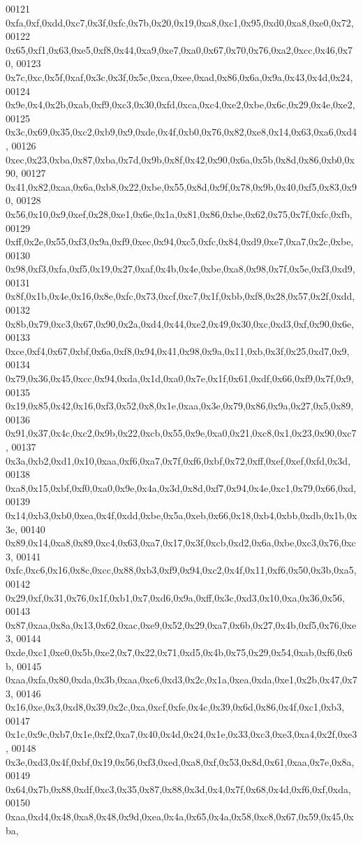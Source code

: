 \begin{DoxyCode}
00121   0xfa,0xf,0xdd,0xc7,0x3f,0xfc,0x7b,0x20,0x19,0xa8,0xc1,0x95,0xd0,0xa8,0xe0,0x72,
00122   0x65,0xf1,0x63,0xe5,0xf8,0x44,0xa9,0xe7,0xa0,0x67,0x70,0x76,0xa2,0xcc,0x46,0x70,
00123   0x7c,0xc,0x5f,0xaf,0x3c,0x3f,0x5c,0xca,0xee,0xad,0x86,0x6a,0x9a,0x43,0x4d,0x24,
00124   0x9e,0x4,0x2b,0xab,0xf9,0xc3,0x30,0xfd,0xca,0xc4,0xe2,0xbe,0x6c,0x29,0x4e,0xe2,
00125   0x3c,0x69,0x35,0xc2,0xb9,0x9,0xde,0x4f,0xb0,0x76,0x82,0xe8,0x14,0x63,0xa6,0xd4,
00126   0xec,0x23,0xba,0x87,0xba,0x7d,0x9b,0x8f,0x42,0x90,0x6a,0x5b,0x8d,0x86,0xb0,0x90,
00127   0x41,0x82,0xaa,0x6a,0xb8,0x22,0xbe,0x55,0x8d,0x9f,0x78,0x9b,0x40,0xf5,0x83,0x90,
00128   0x56,0x10,0x9,0xef,0x28,0xe1,0x6e,0x1a,0x81,0x86,0xbe,0x62,0x75,0x7f,0xfc,0xfb,
00129   0xff,0x2e,0x55,0xf3,0x9a,0xf9,0xec,0x94,0xc5,0xfc,0x84,0xd9,0xe7,0xa7,0x2c,0xbe,
00130   0x98,0xf3,0xfa,0xf5,0x19,0x27,0xaf,0x4b,0x4e,0xbe,0xa8,0x98,0x7f,0x5e,0xf3,0xd9,
00131   0x8f,0x1b,0x4e,0x16,0x8e,0xfc,0x73,0xcf,0xc7,0x1f,0xbb,0xf8,0x28,0x57,0x2f,0xdd,
00132   0x8b,0x79,0xc3,0x67,0x90,0x2a,0xd4,0x44,0xe2,0x49,0x30,0xc,0xd3,0xf,0x90,0x6e,
00133   0xce,0xf4,0x67,0xbf,0x6a,0xf8,0x94,0x41,0x98,0x9a,0x11,0xb,0x3f,0x25,0xd7,0x9,
00134   0x79,0x36,0x45,0xcc,0x94,0xda,0x1d,0xa0,0x7e,0x1f,0x61,0xdf,0x66,0xf9,0x7f,0x9,
00135   0x19,0x85,0x42,0x16,0xf3,0x52,0x8,0x1e,0xaa,0x3e,0x79,0x86,0x9a,0x27,0x5,0x89,
00136   0x91,0x37,0x4c,0xc2,0x9b,0x22,0xcb,0x55,0x9e,0xa0,0x21,0xc8,0x1,0x23,0x90,0xc7,
00137   0x3a,0xb2,0xd1,0x10,0xaa,0xf6,0xa7,0x7f,0xf6,0xbf,0x72,0xff,0xef,0xef,0xfd,0x3d,
00138   0xa8,0x15,0xbf,0xf0,0xa0,0x9e,0x4a,0x3d,0x8d,0xf7,0x94,0x4e,0xc1,0x79,0x66,0xd,
00139   0x14,0xb3,0xb0,0xea,0x4f,0xdd,0xbe,0x5a,0xeb,0x66,0x18,0xb4,0xbb,0xdb,0x1b,0x3e,
00140   0x89,0x14,0xa8,0x89,0xc4,0x63,0xa7,0x17,0x3f,0xcb,0xd2,0x6a,0xbe,0xc3,0x76,0xc3,
00141   0xfc,0xc6,0x16,0x8c,0xcc,0x88,0xb3,0xf9,0x94,0xc2,0x4f,0x11,0xf6,0x50,0x3b,0xa5,
00142   0x29,0xf,0x31,0x76,0x1f,0xb1,0x7,0xd6,0x9a,0xff,0x3c,0xd3,0x10,0xa,0x36,0x56,
00143   0x87,0xaa,0x8a,0x13,0x62,0xac,0xe9,0x52,0x29,0xa7,0x6b,0x27,0x4b,0xf5,0x76,0xe3,
00144   0xde,0xc1,0xe0,0x5b,0xe2,0x7,0x22,0x71,0xd5,0x4b,0x75,0x29,0x54,0xab,0xf6,0x6b,
00145   0xaa,0xfa,0x80,0xda,0x3b,0xaa,0xc6,0xd3,0x2c,0x1a,0xea,0xda,0xe1,0x2b,0x47,0x73,
00146   0x16,0xe,0x3,0xd8,0x39,0x2c,0xa,0xcf,0xfe,0x4c,0x39,0x6d,0x86,0x4f,0xc1,0xb3,
00147   0x1c,0x9c,0xb7,0x1e,0xf2,0xa7,0x40,0x4d,0x24,0x1e,0x33,0xc3,0xe3,0xa4,0x2f,0xe3,
00148   0x3e,0xd3,0x4f,0xbf,0x19,0x56,0xf3,0xed,0xa8,0xf,0x53,0x8d,0x61,0xaa,0x7e,0x8a,
00149   0x64,0x7b,0x88,0xdf,0xc3,0x35,0x87,0x88,0x3d,0x4,0x7f,0x68,0x4d,0xf6,0xf,0xda,
00150   0xaa,0xd4,0x48,0xa8,0x48,0x9d,0xea,0x4a,0x65,0x4a,0x58,0xc8,0x67,0x59,0x45,0xba,

\end{DoxyCode}
